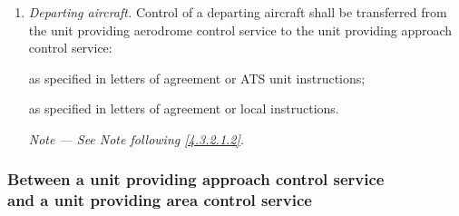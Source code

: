 \documentclass[../main.tex]{subfiles}
\begin{document}
\begin{enumerate}
\begin{enumerate}
            \item \textit{Departing aircraft.} Control of a departing aircraft shall be transferred from the unit providing aerodrome control service to the unit providing approach control service:

                
            \noindent as specified in letters of agreement or ATS unit instructions;

            
            \noindent as specified in letters of agreement or local instructions.

            \textit{Note --- See Note following \ref{4.3.2.1.2}.}
        \end{enumerate}
    \end{enumerate}

    \subsubsection[Between a unit providing approach control service and a unit providing area control service]{Between a unit providing approach control service \\ and a unit providing area control service}
\end{document}
